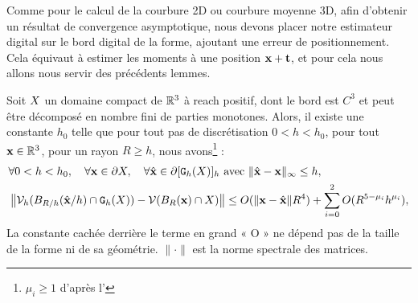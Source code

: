 %
Comme pour le calcul de la courbure 2D ou courbure moyenne 3D, afin d'obtenir un
résultat de convergence asymptotique, nous devons placer notre estimateur
digital sur le bord digital de la forme, ajoutant une erreur de positionnement.
Cela équivaut à estimer les moments à une position $\mathbf{x} + \mathbf{t}$, et pour cela
nous allons nous servir des précédents lemmes.
%
\begin{theorem}
\label{thm:multigrid-conv-cov-matrix}
%
  Soit $X$ un domaine compact de $\mathbb{R}^3$ à reach positif, dont le bord est
  $C^3$ et peut être décomposé en nombre fini de parties monotones. Alors, il
  existe une constante $h_0$ telle que pour tout pas de discrétisation $0 < h <
  h_0$, pour tout $\mathbf{x} \in \mathbb{R}^3$, pour un rayon $R \ge h$, nous
  avons\footnote{$\mu_i \ge 1$ d'après
  l'} :
%
  \begin{align}
    &\forall 0 < h < h_0, \quad \forall \mathbf{x} \in \partial X, \quad
    \forall \hat{\mathbf{x}} \in \partial \lbrack \mathtt{G}_{h}(X) \rbrack_{h} \text{~avec~} \| \hat{\mathbf{x}} -\mathbf{x}\|_\infty \le h, \nonumber \\
    &\left\| \mathcal{V}_{h}( B_{R/h}(\hat{\mathbf{x}}/h) \cap  \mathtt{G}_{h}(X) ) - \mathcal{V}( B_{R}(\mathbf{x}) \cap X )\right \|\le O(\|\mathbf{x}-\hat{\mathbf{x}}\| R^4) + \sum_{i=0}^2 O(R^{5-\mu_i}h^{\mu_i}),
  \end{align}
  La constante cachée derrière le terme en grand « O » ne dépend pas de la
  taille de la forme ni de sa géométrie. $\|\cdot\|$ est la norme spectrale des
  matrices.
\end{theorem}
